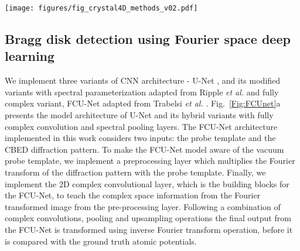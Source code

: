 \documentclass[%
 reprint,
superscriptaddress,
 amsmath,
 amssymb,
 prl,
]{revtex4-2}
\begin{document}

\begin{figure*}[htbp]
\texttt{[image: figures/fig\_crystal4D\_methods\_v02.pdf]}
\caption{{\bf FCU-Net network architecture.} (a) Architecture of the neural network implemented to predict pixel-wise regression maps of the projected atomic potential. (b) Complex convolution operation performed on CBED images cross-correlated with vacuum probe template.}
\label{Fig:FCUnet}
\centering
\end{figure*}


\subsection*{Bragg disk detection using Fourier space deep learning}

We implement three variants of CNN architecture - U-Net \cite{ronneberger2015unet}, and its modified variants with spectral parameterization adapted from Ripple \textit{et al.} \citep{rippel2015spectral} and fully complex variant, FCU-Net adapted from Trabelsi \textit{et al.} \citep{trabelsi2017deep}. Fig.~\ref{Fig:FCUnet}a presents the model architecture of U-Net and its hybrid variants with fully complex convolution and spectral pooling layers. The FCU-Net architecture implemented in this work considers two inputs: the probe template and the CBED diffraction pattern. To make the FCU-Net model aware of the vacuum probe template, we implement a preprocessing layer which multiplies the Fourier transform of the diffraction pattern with the probe template. Finally, we implement the 2D complex convolutional layer, which is the building blocks for the FCU-Net, to teach the complex space information from the Fourier transformed image from the pre-processing layer. Following a combination of complex convolutions, pooling and upsampling operations the final output from the FCU-Net is transformed using inverse Fourier transform operation, before it is compared with the ground truth atomic potentials. 
\end{document}
